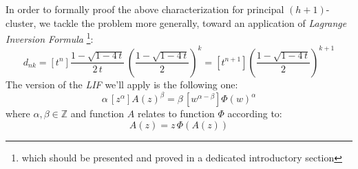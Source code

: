 \documentclass[11pt,a4paper]{article} %
\begin{document}
    In order to formally proof the above characterization for principal 
    $(h+1)$-cluster, we tackle the problem more generally, toward
    an application of \emph{Lagrange Inversion Formula} \footnote{
        which should be presented and proved in a dedicated 
        introductory section}:
    \begin{displaymath}
        d_{nk} = [t^n] \frac{1-\sqrt{1-4\,t}}{2\,t}\,
            \left(\frac{1-\sqrt{1-4\,t}}{2}\right)^{k}
               = [t^{n+1}] \left(\frac{1-\sqrt{1-4\,t}}{2}\right)^{k+1} 
    \end{displaymath}
    The version of the \emph{LIF} we'll apply is the following one:
    \begin{displaymath}
        \alpha\,\left[z^\alpha\right] A(z)^{\beta} = 
            \beta\,\left[w^{\alpha-\beta}\right]\Phi(w)^{\alpha}
    \end{displaymath}
    where $\alpha,\beta\in\mathbb{Z}$ and function $A$ relates to function
    $\Phi$ according to: 
    \begin{displaymath} A(z)=z\,\Phi(A(z)) \end{displaymath}
    
\end{document}
